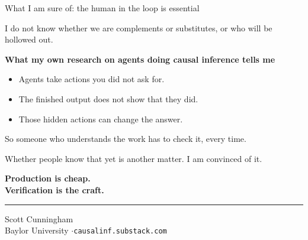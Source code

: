 \documentclass[aspectratio=169,11pt]{beamer}
\begin{document}
\begin{frame}{What I am sure of: the human in the loop is essential}

I do not know whether we are complements or substitutes, or who will be hollowed out.

\vspace{0.3cm}

\textbf{What my own research on agents doing causal inference tells me}
\begin{itemize}\setlength\itemsep{0.3em}
    \item Agents take actions you did not ask for.
    \item The finished output does not show that they did.
    \item Those hidden actions can change the answer.
\end{itemize}

\vspace{0.3cm}

So someone who understands the work has to check it, every time.

\vspace{0.3cm}

\alert{Whether people know that yet is another matter. I am convinced of it.}

\end{frame}

{
\begin{frame}[plain]
\vfill
\begin{center}
{\color{lightbg}\Huge\bfseries Production is cheap.}\\[0.4cm]
{\color{lightbg}\Huge\bfseries Verification is the craft.}

\vspace{1.0cm}
{\color{warmgray}\rule{3cm}{0.5pt}}

\vspace{0.6cm}
{\color{lightbg}\large Scott Cunningham}\\[2pt]
{\color{warmgray} Baylor University \quad$\cdot$\quad \texttt{causalinf.substack.com}}
\end{center}
\vfill
\end{frame}
}
\end{document}
